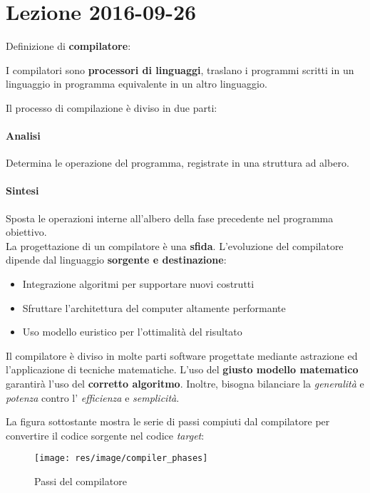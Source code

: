 \section{Lezione 2016-09-26}
Definizione di \textbf{compilatore}:

\begin{definition}
I compilatori sono \textbf{processori di linguaggi}, traslano i programmi
scritti in un linguaggio in programma equivalente in un altro linguaggio.
\end{definition}

Il processo di compilazione è diviso in due parti:
\paragraph{Analisi}
Determina le operazione del programma, registrate in una struttura ad albero.
\paragraph{Sintesi}
Sposta le operazioni interne all'albero della fase precedente nel programma
obiettivo. \\

La progettazione di un compilatore è una \textbf{sfida}. L'evoluzione del
compilatore dipende dal linguaggio \textbf{sorgente e destinazione}:
\begin{itemize}
\item Integrazione algoritmi per supportare nuovi costrutti
\item Sfruttare l'architettura del computer altamente performante
\item Uso modello euristico per l'ottimalità del risultato
\end{itemize}

Il compilatore è diviso in molte parti software progettate mediante astrazione
ed l'applicazione di tecniche matematiche. L'uso del \textbf{giusto modello
matematico} garantirà l'uso del \textbf{corretto algoritmo}. Inoltre, bisogna
bilanciare la \textit{generalità} e \textit{potenza} contro l'
\textit{efficienza} e \textit{semplicità}.

La figura sottostante mostra le serie di passi compiuti dal compilatore per
convertire il codice sorgente nel codice \textit{target}:

\begin{figure}[H]
\begin{center}
\texttt{[image: res/image/compiler\_phases]}
\caption{Passi del compilatore}
\label{fig:compiler_phases}
\end{center}
\end{figure}

